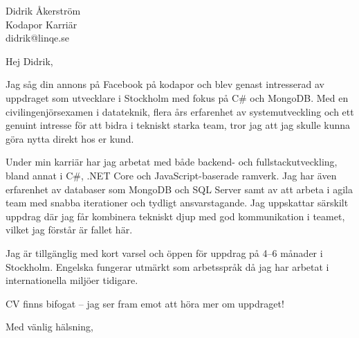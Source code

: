 \documentclass[a4paper,10pt]{letter}
\date{\today}
\begin{document}
\begin{letter}{Didrik Åkerström \\ Kodapor Karriär \\ didrik@linqe.se}

\opening{Hej Didrik,}

Jag såg din annons på Facebook på kodapor och blev genast intresserad av uppdraget som utvecklare i Stockholm med fokus på C\# och MongoDB. Med en civilingenjörsexamen i datateknik, flera års erfarenhet av systemutveckling och ett genuint intresse för att bidra i tekniskt starka team, tror jag att jag skulle kunna göra nytta direkt hos er kund.

Under min karriär har jag arbetat med både backend- och fullstackutveckling, bland annat i C\#, .NET Core och JavaScript-baserade ramverk. Jag har även erfarenhet av databaser som MongoDB och SQL Server samt av att arbeta i agila team med snabba iterationer och tydligt ansvarstagande. Jag uppskattar särskilt uppdrag där jag får kombinera tekniskt djup med god kommunikation i teamet, vilket jag förstår är fallet här.

Jag är tillgänglig med kort varsel och öppen för uppdrag på 4–6 månader i Stockholm. Engelska fungerar utmärkt som arbetsspråk då jag har arbetat i internationella miljöer tidigare.

CV finns bifogat – jag ser fram emot att höra mer om uppdraget!

\closing{Med vänlig hälsning,}

\end{letter}
\end{document}
